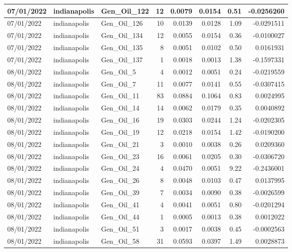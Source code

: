 \documentclass[
  letterpaper,
  DIV=11,
  numbers=noendperiod]{scrartcl}
\begin{document}
\begin{tabular}{l|l|l|r|r|r|r|r}
\hline
07/01/2022 & indianapolis & Gen\_Oil\_122 & 12 & 0.0079 & 0.0154 & 0.51 & -0.0256260\\
\hline
07/01/2022 & indianapolis & Gen\_Oil\_126 & 10 & 0.0139 & 0.0128 & 1.09 & -0.0291511\\
\hline
07/01/2022 & indianapolis & Gen\_Oil\_134 & 12 & 0.0055 & 0.0154 & 0.36 & -0.0100027\\
\hline
07/01/2022 & indianapolis & Gen\_Oil\_135 & 8 & 0.0051 & 0.0102 & 0.50 & 0.0161931\\
\hline
07/01/2022 & indianapolis & Gen\_Oil\_137 & 1 & 0.0018 & 0.0013 & 1.38 & -0.1597331\\
\hline
08/01/2022 & indianapolis & Gen\_Oil\_5 & 4 & 0.0012 & 0.0051 & 0.24 & -0.0219559\\
\hline
08/01/2022 & indianapolis & Gen\_Oil\_7 & 11 & 0.0077 & 0.0141 & 0.55 & -0.0307415\\
\hline
08/01/2022 & indianapolis & Gen\_Oil\_11 & 83 & 0.0884 & 0.1064 & 0.83 & 0.0024995\\
\hline
08/01/2022 & indianapolis & Gen\_Oil\_14 & 14 & 0.0062 & 0.0179 & 0.35 & 0.0040892\\
\hline
08/01/2022 & indianapolis & Gen\_Oil\_16 & 19 & 0.0303 & 0.0244 & 1.24 & -0.0202305\\
\hline
08/01/2022 & indianapolis & Gen\_Oil\_19 & 12 & 0.0218 & 0.0154 & 1.42 & -0.0190200\\
\hline
08/01/2022 & indianapolis & Gen\_Oil\_21 & 3 & 0.0010 & 0.0038 & 0.26 & 0.0209360\\
\hline
08/01/2022 & indianapolis & Gen\_Oil\_23 & 16 & 0.0061 & 0.0205 & 0.30 & -0.0306720\\
\hline
08/01/2022 & indianapolis & Gen\_Oil\_24 & 4 & 0.0470 & 0.0051 & 9.22 & -0.2436001\\
\hline
08/01/2022 & indianapolis & Gen\_Oil\_26 & 8 & 0.0048 & 0.0103 & 0.47 & 0.0137995\\
\hline
08/01/2022 & indianapolis & Gen\_Oil\_39 & 7 & 0.0034 & 0.0090 & 0.38 & -0.0026599\\
\hline
08/01/2022 & indianapolis & Gen\_Oil\_41 & 4 & 0.0041 & 0.0051 & 0.80 & -0.0201294\\
\hline
08/01/2022 & indianapolis & Gen\_Oil\_44 & 1 & 0.0005 & 0.0013 & 0.38 & 0.0012022\\
\hline
08/01/2022 & indianapolis & Gen\_Oil\_51 & 3 & 0.0017 & 0.0038 & 0.45 & -0.0002563\\
\hline
08/01/2022 & indianapolis & Gen\_Oil\_58 & 31 & 0.0593 & 0.0397 & 1.49 & 0.0028873\\

\end{tabular}
\end{document}
